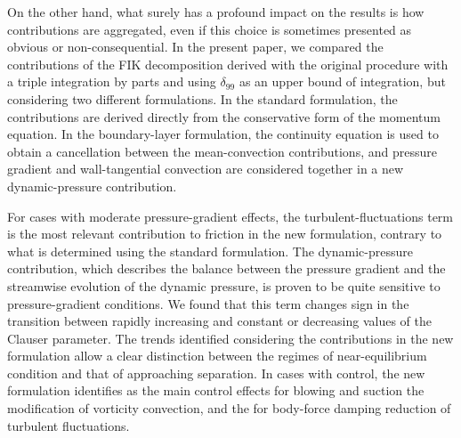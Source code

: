 On the other hand, what surely has a profound impact on the results is how contributions are aggregated, even if this choice is sometimes presented as obvious or non-consequential. In the present paper, we compared the contributions of the FIK decomposition derived with the original procedure with a triple integration by parts and using $\delta_{99}$ as an upper bound of integration, but considering two different formulations. In the standard formulation, the contributions are derived directly from the conservative form of the momentum equation. In the boundary-layer formulation, the continuity equation is used to obtain a cancellation between the mean-convection contributions, and pressure gradient and wall-tangential convection are considered together in a new dynamic-pressure contribution. 

For cases with moderate pressure-gradient effects, the turbulent-fluctuations term is the most relevant contribution to friction in the new formulation, contrary to what is determined using the standard formulation. The dynamic-pressure contribution, which describes the balance between the pressure gradient and the streamwise evolution of the dynamic pressure, is proven to be quite sensitive to pressure-gradient conditions. We found that this term changes sign in the transition between rapidly increasing and constant or decreasing values of the Clauser parameter. The trends identified considering the contributions in the new formulation allow a clear distinction between the regimes of near-equilibrium condition and that of approaching separation. In cases with control, the new formulation identifies as the main control effects for blowing and suction the modification of vorticity convection, and the for body-force damping reduction of turbulent fluctuations. 

